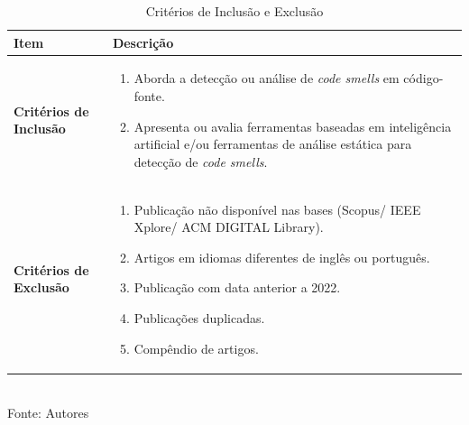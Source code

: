 \begin{table}[h]
    \centering
    \caption{Critérios de Inclusão e Exclusão}
    \label{tab:criterios}
    \begin{tabular}{|p{5cm}|p{10cm}|}
        \hline
        \textbf{Item} & \textbf{Descrição} \\
        \hline
        
        \textbf{Critérios de Inclusão} &
        \begin{enumerate}[leftmargin=*, label=\arabic*.]
            \item Aborda a detecção ou análise de \textit{code smells} em código-fonte.
            \item Apresenta ou avalia ferramentas baseadas em inteligência artificial e/ou ferramentas de análise estática para detecção de \textit{code smells}.
        \end{enumerate} \\
        \hline
        
        \textbf{Critérios de Exclusão} &
        \begin{enumerate}[leftmargin=*, label=\arabic*.]
            \item Publicação não disponível nas bases (Scopus/ IEEE Xplore/ ACM DIGITAL Library).
            \item Artigos em idiomas diferentes de inglês ou português.
            \item Publicação com data anterior a 2022.
            \item Publicações duplicadas.
            \item Compêndio de artigos.
        \end{enumerate} \\
        \hline
    \end{tabular}\\[0.4em]
    Fonte: Autores
\end{table}

